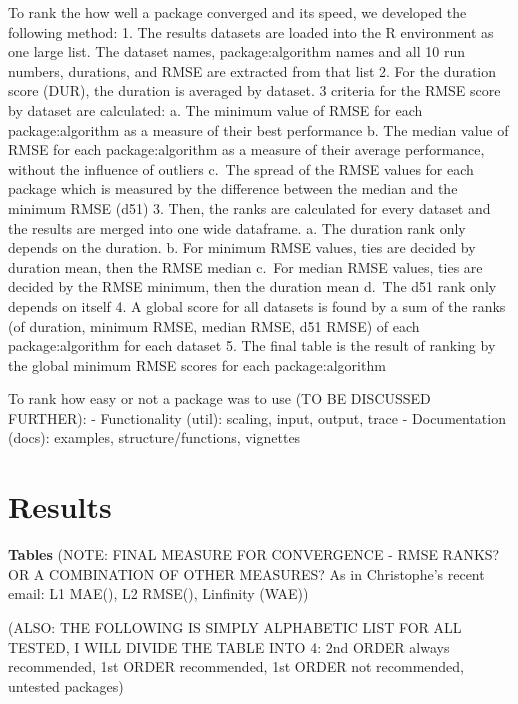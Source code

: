 To rank the how well a package converged and its speed, we developed the
following method: 1. The results datasets are loaded into the R
environment as one large list. The dataset names, package:algorithm
names and all 10 run numbers, durations, and RMSE are extracted from
that list 2. For the duration score (DUR), the duration is averaged by
dataset. 3 criteria for the RMSE score by dataset are calculated: a. The
minimum value of RMSE for each package:algorithm as a measure of their
best performance b. The median value of RMSE for each package:algorithm
as a measure of their average performance, without the influence of
outliers c.~The spread of the RMSE values for each package which is
measured by the difference between the median and the minimum RMSE (d51)
3. Then, the ranks are calculated for every dataset and the results are
merged into one wide dataframe. a. The duration rank only depends on the
duration. b. For minimum RMSE values, ties are decided by duration mean,
then the RMSE median c.~For median RMSE values, ties are decided by the
RMSE minimum, then the duration mean d.~The d51 rank only depends on
itself 4. A global score for all datasets is found by a sum of the ranks
(of duration, minimum RMSE, median RMSE, d51 RMSE) of each
package:algorithm for each dataset 5. The final table is the result of
ranking by the global minimum RMSE scores for each package:algorithm

To rank how easy or not a package was to use (TO BE DISCUSSED FURTHER):
- Functionality (util): scaling, input, output, trace - Documentation
(docs): examples, structure/functions, vignettes

\hypertarget{results}{%
\section{Results}\label{results}}

\textbf{Tables} (NOTE: FINAL MEASURE FOR CONVERGENCE - RMSE RANKS? OR A
COMBINATION OF OTHER MEASURES? As in Christophe's recent email: L1
MAE(), L2 RMSE(), Linfinity (WAE))

(ALSO: THE FOLLOWING IS SIMPLY ALPHABETIC LIST FOR ALL TESTED, I WILL
DIVIDE THE TABLE INTO 4: 2nd ORDER always recommended, 1st ORDER
recommended, 1st ORDER not recommended, untested packages)

